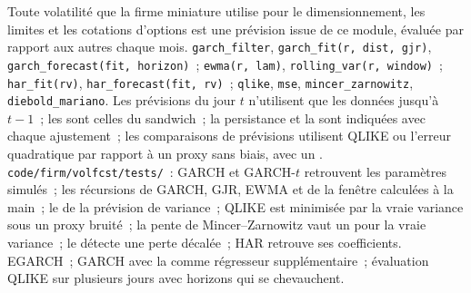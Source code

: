 \begin{build}
 Toute volatilité que la firme miniature utilise pour le dimensionnement, les limites et les cotations d'options est une prévision issue de ce module, évaluée par rapport aux autres
chaque mois.
 \texttt{garch\_filter}, \texttt{garch\_fit(r, dist, gjr)}, \texttt{garch\_forecast(fit, horizon)}~; \texttt{ewma(r, lam)}, \texttt{rolling\_var(r,
window)}~; \texttt{har\_fit(rv)}, \texttt{har\_forecast(fit, rv)}~; \texttt{qlike}, \texttt{mse}, \texttt{mincer\_zarnowitz}, \texttt{diebold\_mariano}.
 Les prévisions du jour $t$ n'utilisent que les données jusqu'à $t - 1$~; les  sont celles du sandwich~; la persistance et la  sont indiquées avec chaque ajustement~; les comparaisons de prévisions
utilisent QLIKE ou l'erreur quadratique par rapport à un proxy sans biais, avec un .
 \texttt{code/firm/volfcst/tests/}~: GARCH et GARCH-$t$ retrouvent les paramètres simulés~; les récursions de GARCH, GJR, EWMA et de la fenêtre
calculées à la main~; le  de la prévision de variance~; QLIKE est minimisée par la vraie variance sous un proxy bruité~; la pente de Mincer--Zarnowitz vaut un pour la vraie
variance~; le  détecte une perte décalée~; HAR retrouve ses coefficients.
 EGARCH~; GARCH avec la  comme régresseur supplémentaire~; évaluation QLIKE sur plusieurs jours avec horizons qui se chevauchent.
\end{build}

